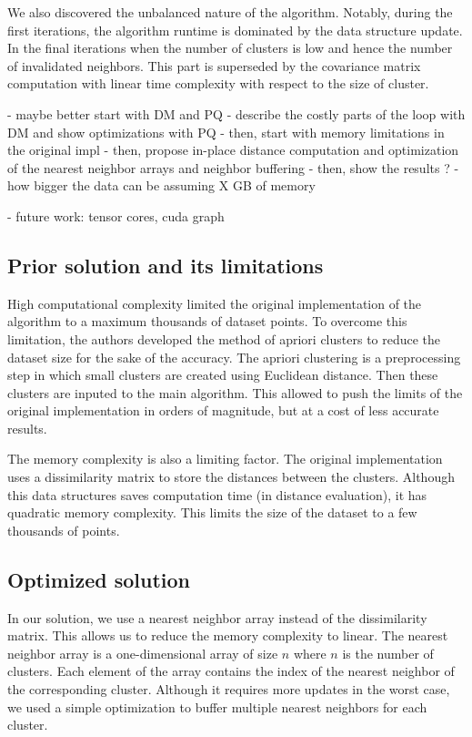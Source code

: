We also discovered the unbalanced nature of the algorithm. Notably, during the first iterations, the algorithm runtime is dominated by the data structure update. In the final iterations when the number of clusters is low and hence the number of invalidated neighbors. This part is superseded by the covariance matrix computation with linear time complexity with respect to the size of cluster. 

- maybe better start with DM and PQ - describe the costly parts of the loop with DM and show optimizations with PQ
- then, start with memory limitations in the original impl
- then, propose in-place distance computation and optimization of the nearest neighbor arrays and neighbor buffering
- then, show the results ? - how bigger the data can be assuming X GB of memory

- future work: tensor cores, cuda graph


\subsection{Prior solution and its limitations}

High computational complexity limited the original implementation of the algorithm to a maximum thousands of dataset points. To overcome this limitation, the authors developed the method of apriori clusters to reduce the dataset size for the sake of the accuracy. The apriori clustering is a preprocessing step in which small clusters are created using Euclidean distance. Then these clusters are inputed to the main algorithm. This allowed to push the limits of the original implementation in orders of magnitude, but at a cost of less accurate results.

The memory complexity is also a limiting factor. The original implementation uses a dissimilarity matrix to store the distances between the clusters. Although this data structures saves computation time (in distance evaluation), it has quadratic memory complexity. This limits the size of the dataset to a few thousands of points.

\subsection{Optimized solution}

In our solution, we use a nearest neighbor array instead of the dissimilarity matrix. This allows us to reduce the memory complexity to linear. The nearest neighbor array is a one-dimensional array of size $n$ where $n$ is the number of clusters. Each element of the array contains the index of the nearest neighbor of the corresponding cluster. Although it requires more updates in the worst case, we used a simple optimization to buffer multiple nearest neighbors for each cluster.

